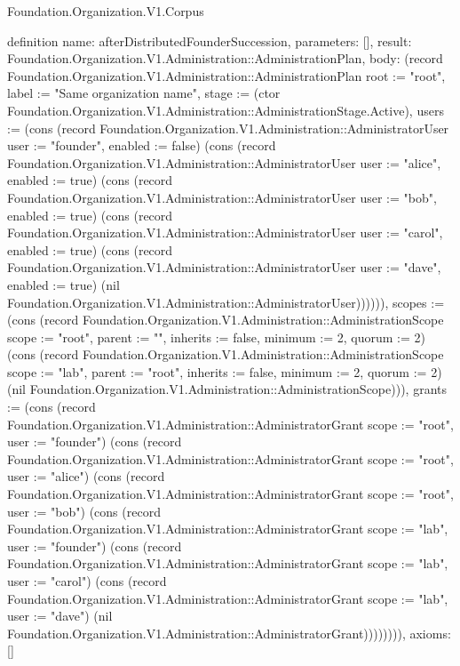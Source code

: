 \begin{lexlean}{Foundation.Organization.V1.Corpus}
\begin{semanticmodule}
definition{
  name: afterDistributedFounderSuccession,
  parameters: [],
  result: Foundation.Organization.V1.Administration::AdministrationPlan,
  body: (record Foundation.Organization.V1.Administration::AdministrationPlan {root := "root", label := "Same organization name", stage := (ctor Foundation.Organization.V1.Administration::AdministrationStage.Active), users := (cons (record Foundation.Organization.V1.Administration::AdministratorUser {user := "founder", enabled := false}) (cons (record Foundation.Organization.V1.Administration::AdministratorUser {user := "alice", enabled := true}) (cons (record Foundation.Organization.V1.Administration::AdministratorUser {user := "bob", enabled := true}) (cons (record Foundation.Organization.V1.Administration::AdministratorUser {user := "carol", enabled := true}) (cons (record Foundation.Organization.V1.Administration::AdministratorUser {user := "dave", enabled := true}) (nil Foundation.Organization.V1.Administration::AdministratorUser)))))), scopes := (cons (record Foundation.Organization.V1.Administration::AdministrationScope {scope := "root", parent := "", inherits := false, minimum := 2, quorum := 2}) (cons (record Foundation.Organization.V1.Administration::AdministrationScope {scope := "lab", parent := "root", inherits := false, minimum := 2, quorum := 2}) (nil Foundation.Organization.V1.Administration::AdministrationScope))), grants := (cons (record Foundation.Organization.V1.Administration::AdministratorGrant {scope := "root", user := "founder"}) (cons (record Foundation.Organization.V1.Administration::AdministratorGrant {scope := "root", user := "alice"}) (cons (record Foundation.Organization.V1.Administration::AdministratorGrant {scope := "root", user := "bob"}) (cons (record Foundation.Organization.V1.Administration::AdministratorGrant {scope := "lab", user := "founder"}) (cons (record Foundation.Organization.V1.Administration::AdministratorGrant {scope := "lab", user := "carol"}) (cons (record Foundation.Organization.V1.Administration::AdministratorGrant {scope := "lab", user := "dave"}) (nil Foundation.Organization.V1.Administration::AdministratorGrant)))))))}),
  axioms: []
}


\end{semanticmodule}
\end{lexlean}
